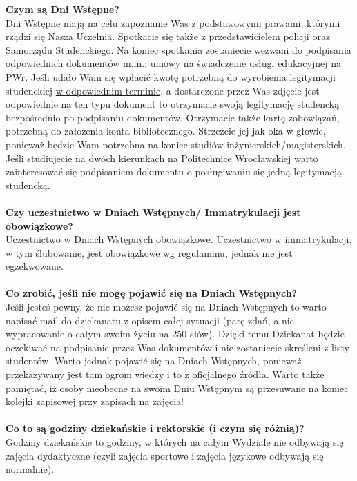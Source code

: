 \documentclass[11pt]{article}
\begin{document}
\noindent \textbf{Czym są Dni Wstępne?}\\
\indent Dni Wstępne mają na celu zapoznanie Was z podstawowymi prawami, którymi rządzi się Nasza Uczelnia. Spotkacie się także z przedstawicielem policji oraz Samorządu Studenckiego. \linebreak Na koniec spotkania zostaniecie wezwani do podpisania odpowiednich dokumentów m.in.: umowy na świadczenie usługi edukacyjnej na PWr. Jeśli udało Wam się wpłacić kwotę potrzebną \linebreak do wyrobienia legitymacji studenckiej \underline{w odpowiednim terminie}, a dostarczone przez Was zdjęcie jest odpowiednie na ten typu dokument 
to otrzymacie swoją legitymację studencką bezpośrednio po podpisaniu dokumentów. Otrzymacie także kartę zobowiązań, potrzebną do założenia konta bibliotecznego. Strzeżcie jej jak oka w głowie, ponieważ będzie Wam potrzebna na koniec studiów inżynierskich/magisterskich. Jeśli studiujecie na dwóch kierunkach na Politechnice Wrocławskiej warto zainteresować się podpisaniem dokumentu o posługiwaniu się jedną legitymacją studencką. \\\\
\textbf{Czy uczestnictwo w Dniach Wstępnych/ Immatrykulacji jest obowiązkowe?} \\
\indent Uczestnictwo w Dniach Wstępnych obowiązkowe. Uczestnictwo w immatrykulacji, w tym ślubowanie, jest obowiązkowe wg regulaminu, jednak nie jest egzekwowane.\\\\
\textbf{Co zrobić, jeśli nie mogę pojawić się na Dniach Wstępnych?}\\
\indent Jeśli jesteś pewny, że nie możesz pojawić się na Dniach Wstępnych to warto napisać mail do dziekanatu z opisem całej sytuacji (parę zdań, a nie wypracowanie o całym swoim życiu na 250 słów). Dzięki temu Dziekanat będzie oczekiwać na podpisanie przez Was dokumentów i nie zostaniecie skreśleni z listy studentów. Warto jednak pojawić się 
na Dniach Wstępnych, ponieważ przekazywany jest tam ogrom wiedzy i to z oficjalnego źródła. Warto także pamiętać, iż osoby nieobecne na swoim Dniu Wstępnym 
są przesuwane na koniec kolejki zapisowej przy zapisach na zajęcia! \\\\
\textbf{Co to są godziny dziekańskie i rektorskie (i czym się różnią)?}\\
\indent Godziny dziekańskie to godziny, w których na całym Wydziale nie odbywają się zajęcia dydaktyczne (czyli zajęcia sportowe i zajęcia językowe odbywają się normalnie). 
\end{document}
